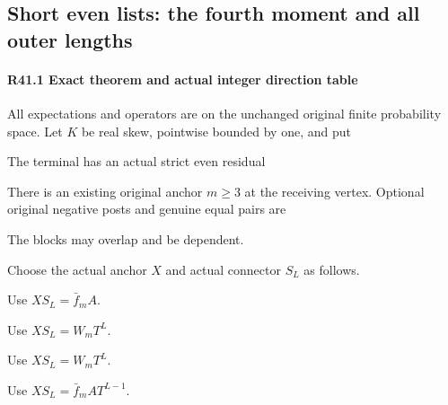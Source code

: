\subsection{Short even lists: the fourth moment and all outer lengths}\label{proof:R2-C041}

\paragraph{R41.1 Exact theorem and actual integer direction table}

All expectations and operators are on the unchanged original finite probability space. Let \(K\) be real skew, pointwise bounded by one, and put



The terminal has an actual strict even residual


There is an existing original anchor \(m\ge3\) at the receiving vertex. Optional original negative posts and genuine equal pairs are


The blocks may overlap and be dependent.

Choose the actual anchor \(X\) and actual connector \(S_L\) as follows.

\begin{description}[style=nextline,leftmargin=1.6em,before=\raggedright]
\item[{$a_1=2$, $L=1$}] Use \(X S_L=\bar f_m A\).
\item[{$a_1=2$, $L\ge2$}] Use \(X S_L=W_mT^L\).
\item[{$a_1=3$, $m\le L$}] Use \(X S_L=W_mT^L\).
\item[{$a_1=3$, $m>L$}] Use \(X S_L=\bar f_mAT^{L-1}\).
\end{description}

